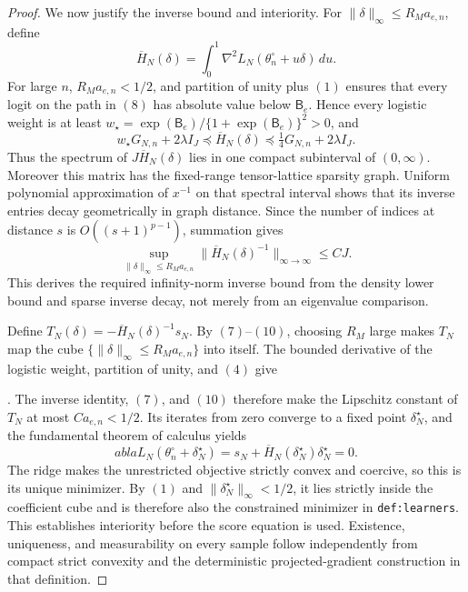 \documentclass{article}
\begin{document}
\begin{proof}
We now justify the inverse bound and interiority. For \(\lVert\delta\rVert_\infty\le R_Ma_{e,n}\), define
\[\overline H_N(\delta)=\int_0^1\nabla^2L_N(\theta_n^\circ+u\delta)\,du.\tag{8}\]
For large \(n\), \(R_Ma_{e,n}<1/2\), and partition of unity plus \((1)\) ensures that every logit on the path in \((8)\) has absolute value below \(\mathsf B_e\). Hence every logistic weight is at least \(w_\star=\exp(\mathsf B_e)/\{1+\exp(\mathsf B_e)\}^2>0\), and
\[w_\star G_{N,n}+2\lambda I_J\preceq\overline H_N(\delta)\preceq\tfrac14G_{N,n}+2\lambda I_J.\tag{9}\]
Thus the spectrum of \(J\overline H_N(\delta)\) lies in one compact subinterval of \((0,\infty)\). Moreover this matrix has the fixed-range tensor-lattice sparsity graph. Uniform polynomial approximation of \(x^{-1}\) on that spectral interval shows that its inverse entries decay geometrically in graph distance. Since the number of indices at distance \(s\) is \(O((s+1)^{p-1})\), summation gives
\[\sup_{\lVert\delta\rVert_\infty\le R_Ma_{e,n}}\lVert\overline H_N(\delta)^{-1}\rVert_{\infty\to\infty}\le CJ.\tag{10}\]
This derives the required infinity-norm inverse bound from the density lower bound and sparse inverse decay, not merely from an eigenvalue comparison.

Define \(T_N(\delta)=-\overline H_N(\delta)^{-1}s_N\). By \((7)\)--\((10)\), choosing \(R_M\) large makes \(T_N\) map the cube \(\{\lVert\delta\rVert_\infty\le R_Ma_{e,n}\}\) into itself. The bounded derivative of the logistic weight, partition of unity, and \((4)\) give \par\noindent {}\par\noindent. The inverse identity, \((7)\), and \((10)\) therefore make the Lipschitz constant of \(T_N\) at most \(Ca_{e,n}<1/2\). Its iterates from zero converge to a fixed point \(\delta_N^\star\), and the fundamental theorem of calculus yields
\[
abla L_N(\theta_n^\circ+\delta_N^\star)=s_N+\overline H_N(\delta_N^\star)\delta_N^\star=0.\tag{11}\]
The ridge makes the unrestricted objective strictly convex and coercive, so this is its unique minimizer. By \((1)\) and \(\lVert\delta_N^\star\rVert_\infty<1/2\), it lies strictly inside the coefficient cube and is therefore also the constrained minimizer in \texttt{def:learners}. This establishes interiority before the score equation is used. Existence, uniqueness, and measurability on every sample follow independently from compact strict convexity and the deterministic projected-gradient construction in that definition.


\end{proof}
\end{document}
